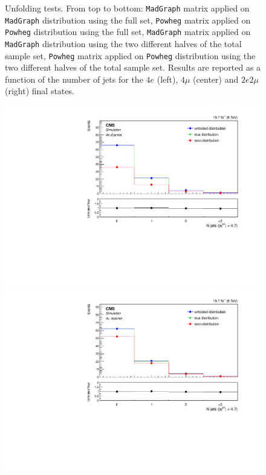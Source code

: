 \begin{figure}[hbtp]
\begin{center}
      \caption{Unfolding tests. From top to bottom: \texttt{MadGraph} matrix applied on \texttt{MadGraph} distribution using the full set, \texttt{Powheg} matrix applied on \texttt{Powheg} distribution using the full set,  \texttt{MadGraph} matrix applied on \texttt{MadGraph} distribution using the two different halves of the total sample set, \texttt{Powheg} matrix applied on \texttt{Powheg} distribution using the two different halves of the total sample set. Results are reported as a function of the number of jets for the $4e$ (left), $4\mu$ (center) and $2e2\mu$ (right) final states.}
    \label{fig:MCtest_Jets1}
  \end{center}
\end{figure}

\begin{figure}[hbtp]
  \begin{center}
    \includegraphics[width=0.8\cmsFigWidth]{Figures/Unfolding/MCTests/Jets_ZZTo4e_MadMatrix_PowDistr_FullSample_fr}     
    \includegraphics[width=0.8\cmsFigWidth]{Figures/Unfolding/MCTests/Jets_ZZTo4m_MadMatrix_PowDistr_FullSample_fr}     

\end{center}
\end{figure}
